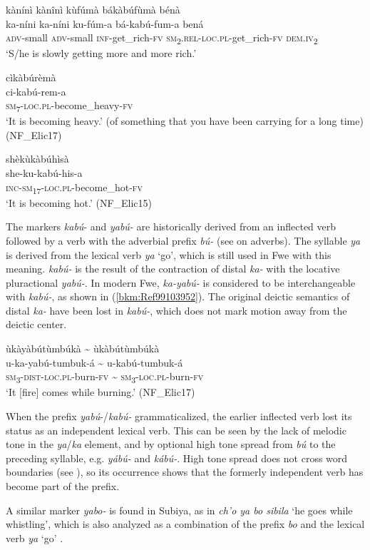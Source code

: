 \ea
\label{bkm:Ref99103865}
kànínì kànînì kùfúmà bákàbúfùmà bénà\\
\gll ka-níni  ka-níni ku-fúm-a    bá-kabú-fum-a      bená \\
\textsc{adv}-small  \textsc{adv}-small
\textsc{inf}-get\_rich-\textsc{fv}  \textsc{sm}\textsubscript{2}.\textsc{rel}-\textsc{loc}.\textsc{pl}-get\_rich-\textsc{fv}  \textsc{dem}.\textsc{iv}\textsubscript{2}\\
\glt ‘S/he is slowly getting more and more rich.’
\z

\ea
\glll cìkàbúrèmà\\
ci-kabú-rem-a\\
\textsc{sm}\textsubscript{7}-\textsc{loc}.\textsc{pl}-become\_heavy-\textsc{fv}\\
\glt ‘It is becoming heavy.’ (of something that you have been carrying for a long time) (NF\_Elic17)
\z

\ea
\label{bkm:Ref99103868}
\glll shèkùkàbúhìsà\\
she-ku-kabú-his-a\\
\textsc{inc}-\textsc{sm}\textsubscript{17}-\textsc{loc}.\textsc{pl}-become\_hot-\textsc{fv}\\
\glt ‘It is becoming hot.’ (NF\_Elic15)
\z

The markers \textit{kabú}- and \textit{yabú-} are historically derived from an inflected verb followed by a verb with the adverbial prefix \textit{bú-} (see  on adverbs). The syllable \textit{ya} is derived from the lexical verb \textit{ya} ‘go’, which is still used in Fwe with this meaning. \textit{kabú-} is the result of the contraction of distal \textit{ka-} with the locative pluractional \textit{yabú-}. In modern Fwe, \textit{ka-yabú-} is considered to be interchangeable with \textit{kabú-}, as shown in (\ref{bkm:Ref99103952}). The original deictic semantics of distal \textit{ka-} have been lost in \textit{kabú-}, which does not mark motion away from the deictic center.

\ea
\label{bkm:Ref99103952}
ùkàyàbútùmbúkà {\textasciitilde} ùkàbútùmbúkà\\
\gll u-ka-yabú-tumbuk-á     {\textasciitilde}  u-kabú-tumbuk-á\\
\textsc{sm}\textsubscript{3}-\textsc{dist}-\textsc{loc}.\textsc{pl}-burn-\textsc{fv}    {\textasciitilde}  \textsc{sm}\textsubscript{3}-\textsc{loc}.\textsc{pl}-burn-\textsc{fv}\\
\glt ‘It [fire] comes while burning.’ (NF\_Elic17)
\z

When the prefix \textit{yabú}-/\textit{kabú-} grammaticalized, the earlier inflected verb lost its status as an independent lexical verb. This can be seen by the lack of melodic tone in the \textit{ya}/\textit{ka} element, and by optional high tone spread from \textit{bú} to the preceding syllable, e.g. \textit{yábú-} and \textit{kábú-}. High tone spread does not cross word boundaries (see ), so its occurrence shows that the formerly independent verb has become part of the prefix.

A similar marker \textit{yabo-} is found in Subiya, as in \textit{ch’o ya bo sibila} ‘he goes while whistling’, which is also analyzed as a combination of the prefix \-\textit{bo} and the lexical verb \textit{ya} ‘go’ \citep[61]{Jacottet1896}.

